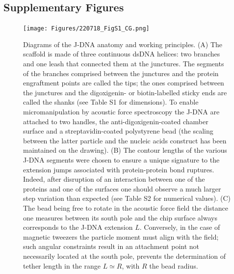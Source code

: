 \documentclass{biophys-new}
\begin{document}
\FloatBarrier

\newpage

\subsection*{Supplementary Figures}

\begin{figure}[hbt!]
	\centering

	\texttt{[image: Figures/220718\_FigS1\_CG.png]}
	
	\caption{Diagrams of the J-DNA anatomy and working principles. (A) The scaffold is made of three continuous dsDNA helices: two branches and one leash that connected them at the junctures. The segments of the branches comprised between the junctures and the protein engraftment points are called the tips; the ones comprised between the junctures and the digoxigenin- or biotin-labelled sticky ends are called the shanks (see Table S1 for dimensions). To enable micromanipulation by acoustic force spectroscopy the J-DNA are attached to two handles, the anti-digoxigenin-coated chamber surface and a streptavidin-coated polystyrene bead (the scaling between the latter particle and the nucleic acids construct has been maintained on the drawing). (B) The contour lengths of the various J-DNA segments were chosen to ensure a unique signature to the extension jumps associated with protein-protein bond ruptures. Indeed, after disruption of an interaction between one of the proteins and one of the surfaces one should observe a much larger step variation than expected (see Table S2 for numerical values). (C) The bead being free to rotate in the acoustic force field the distance one measures between its south pole and the chip surface always corresponds to the J-DNA extension $L$. Conversely, in the case of magnetic tweezers the particle moment must align with the field; such angular constraints result in an attachment point not necessarily located at the south pole, prevents the determination of tether length in the range $L \simeq R$, with $R$ the bead radius.}
	\label{fig:JDNA_anatomy}
\end{figure}
\end{document}
